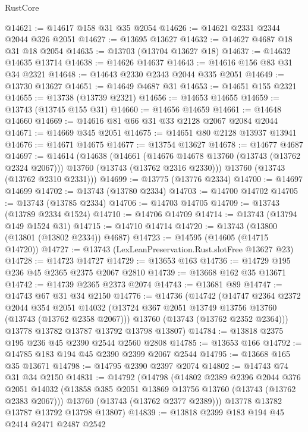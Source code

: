 \begin{lexlean}{RustCore}
\begin{coremodule}
@14621 := @14617 @158 @31 @35 @2054
@14626 := @14621 @2331 @2344 @2044 @326 @2051
@14627 := @13695 @13627
@14632 := @14627 @4687 @18 @31 @18 @2054
@14635 := @13703 (@13704 @13627 @18)
@14637 := @14632 @14635 @13714
@14638 := @14626 @14637
@14643 := @14616 @156 @83 @31 @34 @2321
@14648 := @14643 @2330 @2343 @2044 @335 @2051
@14649 := @13730 @13627
@14651 := @14649 @4687 @31
@14653 := @14651 @155 @2321
@14655 := @13738 (@13739 @2321)
@14656 := @14653 @14655
@14659 := @13743 (@13745 @155 @31)
@14660 := @14656 @14659
@14661 := @14648 @14660
@14669 := @14616 @81 @66 @31 @33 @2128 @2067 @2084 @2044
@14671 := @14669 @345 @2051
@14675 := @14651 @80 @2128 @13937 @13941
@14676 := @14671 @14675
@14677 := @13754 @13627
@14678 := @14677 @4687
@14697 := @14614
    (@14638
      (@14661
        (@14676 @14678 @13760 (@13743 (@13762 @2324 @2067)))
        @13760
        (@13743 (@13762 @2316 @2330)))
      @13760
      (@13743 (@13762 @2310 @2331)))
@14699 := @13775 (@13776 @2334)
@14700 := @14697 @14699
@14702 := @13743 (@13780 @2334)
@14703 := @14700 @14702
@14705 := @13743 (@13785 @2334)
@14706 := @14703 @14705
@14709 := @13743 (@13789 @2334 @1524)
@14710 := @14706 @14709
@14714 := @13743 (@13794 @149 @1524 @31)
@14715 := @14710 @14714
@14720 := @13743 (@13800 (@13801 (@13802 @2334)) @4687)
@14723 := @14595 (@14605 (@14715 @14720))
@14727 := @13743 (LexLeanPreservation.Rust.slotFree @13627 @23)
@14728 := @14723 @14727
@14729 := @13653 @163
@14736 := @14729 @195 @236 @45 @2365 @2375 @2067 @2810
@14739 := @13668 @162 @35 @13671
@14742 := @14739 @2365 @2373 @2074
@14743 := @13681 @89
@14747 := @14743 @67 @31 @34 @2150
@14776 := @14736
    (@14742
      (@14747
        @2364
        @2372
        @2044
        @354
        @2051
        @14032
        (@13724 @367 @2051 @13749 @13756 @13760 (@13743 (@13762 @2358 @2067)))
        @13760
        (@13743 (@13762 @2352 @2364)))
      @13778
      @13782
      @13787
      @13792
      @13798
      @13807)
@14784 := @13818 @2375 @195 @236 @45 @2390 @2544 @2560 @2808
@14785 := @13653 @166
@14792 := @14785 @183 @194 @45 @2390 @2399 @2067 @2544
@14795 := @13668 @165 @35 @13671
@14798 := @14795 @2390 @2397 @2074
@14802 := @14743 @74 @31 @34 @2150
@14831 := @14792
    (@14798
      (@14802
        @2389
        @2396
        @2044
        @376
        @2051
        @14032
        (@13858 @385 @2051 @13869 @13756 @13760 (@13743 (@13762 @2383 @2067)))
        @13760
        (@13743 (@13762 @2377 @2389)))
      @13778
      @13782
      @13787
      @13792
      @13798
      @13807)
@14839 := @13818 @2399 @183 @194 @45 @2414 @2471 @2487 @2542

\end{coremodule}
\end{lexlean}
